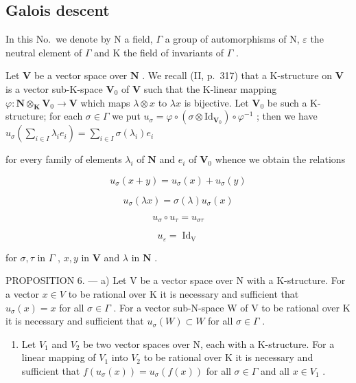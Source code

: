 \subsection{Galois descent}

In this No.~we denote by N a field, \(\Gamma\) a group of automorphisms of N, \(\varepsilon\) the neutral element of \(\Gamma\) and K the field of invariants of \(\Gamma\) .

Let \(\mathbf{V}\) be a vector space over \(\mathbf{N}\) . We recall (II, p.~317) that a K-structure on \(\mathbf{V}\) is a vector sub-K-space \(\mathbf{V}_0\) of \(\mathbf{V}\) such that the K-linear mapping \(\varphi: \mathbf{N} \otimes_{\mathbf{K}} \mathbf{V}_0 \to \mathbf{V}\) which maps \(\lambda \otimes x\) to \(\lambda x\) is bijective. Let \(\mathbf{V}_0\) be such a K-structure; for each \(\sigma \in \Gamma\) we put \(u_\sigma = \varphi \circ (\sigma \otimes \mathrm{Id}_{\mathbf{V}_0}) \circ \varphi^{-1}\) ; then we have \(u_\sigma \left( \sum_{i \in I} \lambda_i e_i \right) = \sum_{i \in I} \sigma(\lambda_i) e_i\)

for every family of elements \(\lambda_{i}\) of \(\mathbf{N}\) and \(e_i\) of \(\mathbf{V}_0\) whence we obtain the relations

\[
u _ {\sigma} (x + y) = u _ {\sigma} (x) + u _ {\sigma} (y)\tag{1}
\]

\[
u _ {\sigma} (\lambda x) = \sigma (\lambda) u _ {\sigma} (x)\tag{2}
\]

\[
u _ {\sigma} \circ u _ {\tau} = u _ {\sigma \tau}\tag{3}
\]

\[
u _ {\varepsilon} = \operatorname{Id} _ {\mathrm{V}}\tag{4}
\]

for \(\sigma, \tau\) in \(\Gamma\) , \(x, y\) in \(\mathbf{V}\) and \(\lambda\) in \(\mathbf{N}\) .

PROPOSITION 6. --- a) Let V be a vector space over N with a K-structure. For a vector \(x \in V\) to be rational over K it is necessary and sufficient that \(u_{\sigma}(x) = x\) for all \(\sigma \in \Gamma\) . For a vector sub-N-space W of V to be rational over K it is necessary and sufficient that \(u_{\sigma}(W) \subset W\) for all \(\sigma \in \Gamma\) .

\begin{enumerate}
\def\labelenumi{\alph{enumi})}
\setcounter{enumi}{1}
\tightlist
\item
  Let \(V_{1}\) and \(V_{2}\) be two vector spaces over N, each with a K-structure. For a linear mapping of \(V_{1}\) into \(V_{2}\) to be rational over K it is necessary and sufficient that \(f(u_{\sigma}(x)) = u_{\sigma}(f(x))\) for all \(\sigma \in \Gamma\) and all \(x \in V_{1}\) .
\end{enumerate}

